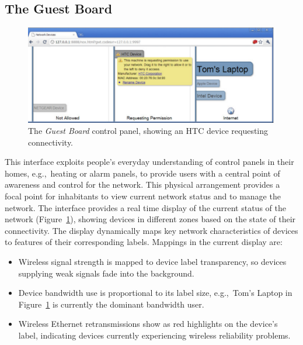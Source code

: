 \subsection{The Guest Board} \label{s:guest-board}

\begin{figure} 
  \centering 
  \includegraphics[width=0.9\columnwidth]{homework_guest_board}
  \caption[The \emph{Guest Board} control panel]{\label{f:guest-board}The \emph{Guest Board} control panel, showing an
    HTC device requesting connectivity.}
\end{figure}

This interface exploits people's everyday understanding of control panels in
their homes, e.g.,~heating or alarm panels, to provide users with a central
point of awareness and control for the network. This physical arrangement
provides a focal point for inhabitants to view current network status and to
manage the network.  The interface provides a real time display of the current
status of the network (Figure~\ref{f:guest-board}), showing devices in different
zones based on the state of their connectivity.  The display dynamically maps
key network characteristics of devices to features of their corresponding
labels.  Mappings in the current display are: 

\begin{itemize}
\item Wireless signal strength is mapped to device label transparency, so
      devices supplying weak signals fade into the background.
\item Device bandwidth use is proportional to its label size, e.g.,~Tom's Laptop
      in Figure~\ref{f:guest-board} is currently the dominant bandwidth user. 
\item Wireless Ethernet retransmissions show as red highlights on the device's
  label, indicating devices currently experiencing wireless reliability problems. 
\end{itemize}

